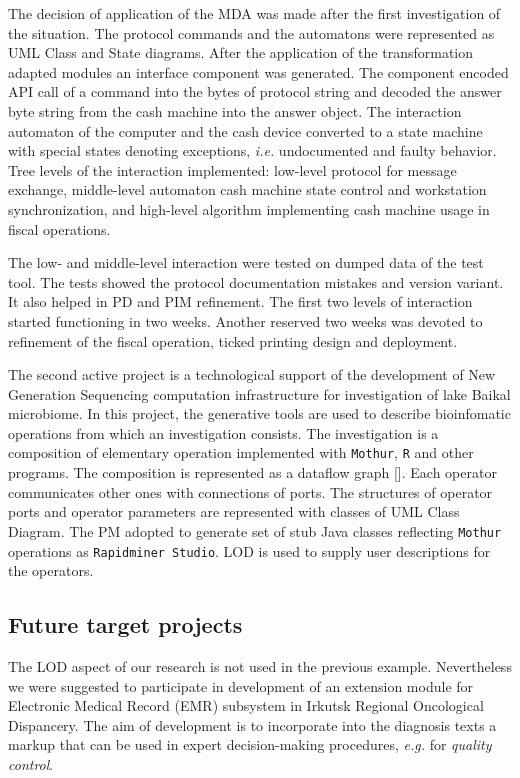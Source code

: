 \documentclass[conference,a4paper]{IEEEtran}
\begin{document}
The decision of application of the MDA was made after the first investigation of the situation.  The protocol commands and the automatons were represented as UML Class and State diagrams.  After the application of the transformation adapted modules an interface component was generated.  The component encoded API call of a command into the bytes of protocol string and decoded the answer byte string from the cash machine into the answer object.  The interaction automaton of the computer and the cash device converted to a state machine with special states denoting exceptions, \emph{i.e.} undocumented and faulty behavior.  Tree levels of the interaction implemented: low-level protocol for message exchange, middle-level automaton cash machine state control and workstation synchronization, and high-level algorithm implementing cash machine usage in fiscal operations.

The low- and middle-level interaction were tested on dumped data of the test tool.  The tests showed the protocol documentation mistakes and version variant.  It also helped in PD and PIM refinement.  The first two levels of interaction started functioning in two weeks.  Another reserved two weeks was devoted to refinement of the fiscal operation, ticked printing design and deployment.

The second active project is a technological support of the development of New Generation Sequencing computation infrastructure for investigation of lake Baikal microbiome.  In this project, the generative tools are used to describe bioinfomatic operations from which an investigation consists.  The investigation is a composition of elementary operation implemented with \texttt{Mothur}, \texttt{R} and other programs.  The composition is represented as a dataflow graph [].  Each operator communicates other ones with connections of ports.  The structures of operator ports and operator parameters are represented with classes of UML Class Diagram.  The PM adopted to generate set of stub Java classes reflecting \texttt{Mothur} operations as \texttt{Rapidminer Studio}.  LOD is used to supply user descriptions for the operators.

\subsection{Future target projects}
\label{sec:futuretargets}

The LOD aspect of our research is not used in the previous example.  Nevertheless we were suggested to participate in development of an extension module for Electronic Medical Record (EMR) subsystem in Irkutsk Regional Oncological Dispancery.  The aim of development is to incorporate into the diagnosis texts a markup that can be used in expert decision-making procedures, \emph{e.g.} for \emph{quality control}.
\end{document}
